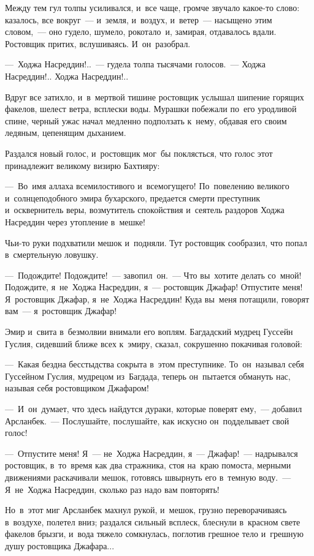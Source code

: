 \documentclass[12pt,a4paper]{book}
\begin{document}
Между тем гул толпы усиливался, и~все чаще, громче звучало какое-то слово: казалось, все вокруг~— и~земля, и~воздух, и~ветер~— насыщено этим словом,~— оно гудело, шумело, рокотало~и, замирая, отдавалось вдали. Ростовщик притих, вслушиваясь. И~он~разобрал.

—~Ходжа Насреддин!..~— гудела толпа тысячами голосов.~— Ходжа Насреддин!.. Ходжа Насреддин!..

Вдруг все затихло, и~в~мертвой тишине ростовщик услышал шипение горящих факелов, шелест ветра, всплески воды. Мурашки побежали по~его уродливой спине, черный ужас начал медленно подползать к~нему, обдавая его своим ледяным, цепенящим дыханием.

Раздался новый голос, и~ростовщик мог~бы поклясться, что голос этот принадлежит великому визирю Бахтияру:

—~Во~имя аллаха всемилостивого и~всемогущего! По~повелению великого и~солнцеподобного эмира бухарского, предается смерти преступник и~осквернитель веры, возмутитель спокойствия и~сеятель раздоров Ходжа Насреддин через утопление в~мешке!

Чьи-то руки подхватили мешок и~подняли. Тут ростовщик сообразил, что попал в~смертельную ловушку.

—~Подождите! Подождите!~— завопил~он.~— Что вы~хотите делать со~мной! Подождите, я~не~Ходжа Насреддин, я~— ростовщик Джафар! Отпустите меня! Я~ростовщик Джафар, я~не~Ходжа Насреддин! Куда вы~меня потащили, говорят вам~— я~ростовщик Джафар!

Эмир и~свита в~безмолвии внимали его воплям. Багдадский мудрец Гуссейн Гуслия, сидевший ближе всех к~эмиру, сказал, сокрушенно покачивая головой:

—~Какая бездна бесстыдства сокрыта в~этом преступнике. То~он~называл себя Гуссейном Гуслия, мудрецом из~Багдада, теперь он~пытается обмануть нас, называя себя ростовщиком Джафаром!

—~И~он~думает, что здесь найдутся дураки, которые поверят ему,~— добавил Арсланбек.~— Послушайте, послушайте, как искусно он~подделывает свой голос!

—~Отпустите меня! Я~— не~Ходжа Насреддин, я~— Джафар!~— надрывался ростовщик, в~то~время как два стражника, стоя на~краю помоста, мерными движениями раскачивали мешок, готовясь швырнуть его в~темную воду.~— Я~не~Ходжа Насреддин, сколько раз надо вам повторять!

Но~в~этот миг Арсланбек махнул рукой, и~мешок, грузно переворачиваясь в~воздухе, полетел вниз; раздался сильный всплеск, блеснули в~красном свете факелов брызги, и~вода тяжело сомкнулась, поглотив грешное тело и~грешную душу ростовщика Джафара...
\end{document}
